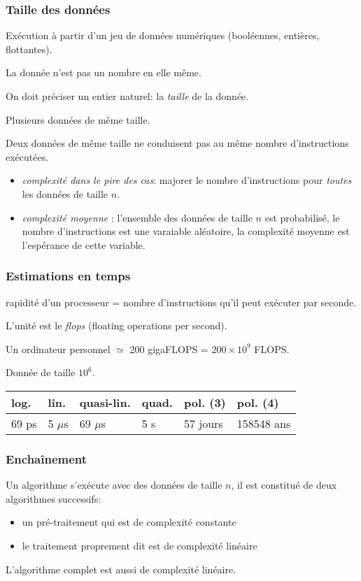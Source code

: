 \begin{frame}
  \frametitle{Taille des données}
Exécution à partir d'un jeu de données numériques (booléennes, entières, flottantes).

La donnée n'est pas un nombre en elle même.

On doit préciser un entier naturel: la \emph{taille} de la donnée.

Plusieurs données de même taille.

Deux données de même taille ne conduisent pas au même nombre d'instructions exécutées.
\begin{itemize}
  \item \emph{complexité dans le pire des cas}: majorer le nombre d'instructions pour \emph{toutes} les données de taille $n$.
  \item \emph{complexité moyenne} : l'ensemble des données de taille $n$ est probabilisé, le nombre d'instructions est une varaiable aléatoire, la complexité moyenne est l'espérance de cette variable.
\end{itemize}
\end{frame}

\begin{frame}
  \frametitle{Estimations en temps}
rapidité d'un processeur = nombre d'instructions qu'il peut exécuter par seconde.

L'unité est le \emph{flops} (floating operations per second).

Un ordinateur personnel $\simeq$ 200 gigaFLOPS = $200\times 10^{9}$ FLOPS.

Donnée de taille $10^{6}$.
\begin{center}
\renewcommand{\arraystretch}{1.5}
\begin{tabular}{|l|l|l|l|l|l|} \hline
log. & lin. & quasi-lin. & quad. & pol. (3) & pol. (4)\\ \hline
69 ps & 5 $\mu$s & 69 $\mu$s & 5 s & 57 jours & 158548 ans \\ \hline
\end{tabular}
\end{center}
\end{frame}

\begin{frame}
  \frametitle{Enchaînement}
Un algorithme s'exécute avec des données de taille $n$, il est constitué de deux algorithmes successifs:
\begin{itemize}
  \item un pré-traitement qui est de complexité constante
  \item le traitement proprement dit est de complexité linéaire  
\end{itemize}
L'algorithme complet est aussi de complexité linéaire.
\end{frame}


